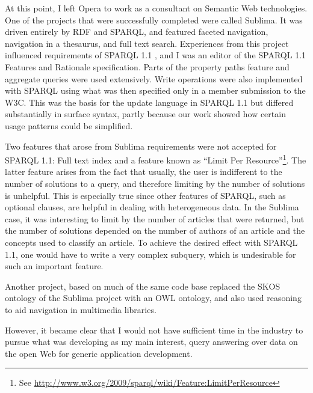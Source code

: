At this point, I left Opera to work as a consultant on Semantic Web
technologies. One of the projects that were successfully completed were
called Sublima\cite{sublima}. It was driven entirely by RDF and SPARQL,
and featured faceted navigation, navigation in a thesaurus, and full
text search. Experiences from this project influenced requirements of
SPARQL 1.1 \cite{sparql11query}, and I was an editor of the SPARQL 1.1 Features and
Rationale specification\cite{sparql11new}. Parts of the property paths
feature and aggregate queries were used extensively. Write operations
were also implemented with SPARQL using what was then specified only
in a member submission to the W3C\cite{seaborne2008sparql}. This was the basis for
the update language in SPARQL 1.1 but differed substantially in
surface syntax, partly because our work showed how certain usage patterns
could be simplified. 

Two features that arose from Sublima requirements were not accepted
for SPARQL 1.1: Full text index and a feature known as
``Limit Per Resource''\footnote{See
  \url{http://www.w3.org/2009/sparql/wiki/Feature:LimitPerResource}}. The
latter feature arises from the fact that usually, the user is
indifferent to the number of solutions to a query, and therefore
limiting by the number of solutions is unhelpful. This is especially
true since other features of SPARQL, such as optional clauses, are
helpful in dealing with heterogeneous data. In the Sublima case, it
was interesting to limit by the number of articles that were returned,
but the number of solutions depended on the number of authors of an
article and the concepts used to classify an article. To achieve the
desired effect with SPARQL 1.1, one would have to write a very complex
subquery, which is undesirable for such an important feature.


Another project, based on much of the same code
base replaced the SKOS ontology of the Sublima project with an OWL
ontology, and also used reasoning to aid navigation in multimedia
libraries.



However, it became clear that I would not have sufficient time in the
industry to pursue what was developing as my main interest, query
answering over data on the open Web for generic application
development. 
